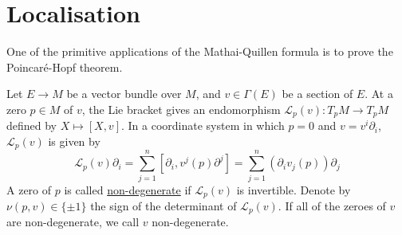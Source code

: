 \section{Localisation}
One of the primitive applications of the Mathai-Quillen formula is to prove the
Poincar\'e-Hopf theorem. 

Let $E\to M$ be a vector bundle over  $M$, and $v\in\Gamma(E)$ be a section of $E$.
At a zero $p\in M$ of  $v$, the Lie bracket gives an endomorphism 
$\mathcal{L}_p(v) : T_pM \to T_pM$ defined by  $X\mapsto [X,v]$. In a coordinate system in
which  $p=0$ and  $v= v^i \partial_i$,  $\mathcal{L}_p(v)$ is given by 
 \[
	 \mathcal{L}_p(v)\partial_i = \sum_{j=1}^{n} [\partial_i, v^j(p)\partial^j] 
	 = \sum_{j=1}^{n} (\partial_i v_j(p)) \partial_j
\] 
A zero of $p$ is called \underline{non-degenerate} if  $\mathcal{L}_p(v)$ is
invertible. Denote by $\nu(p,v) \in \{\pm 1\}$ the sign of the determinant of
$\mathcal{L}_p(v)$. If all of the zeroes of $v$ are non-degenerate, we call  $v$
non-degenerate. 

